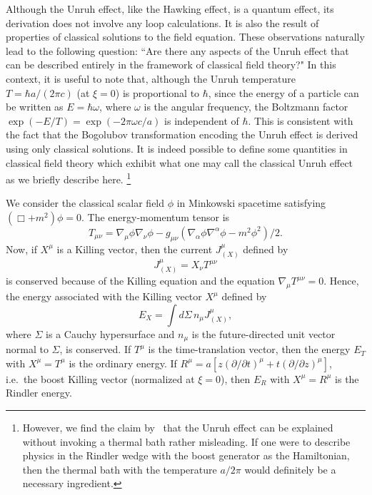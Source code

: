 \documentclass[12pt,nofootinbib,floatfix,aps,prd,showpacs,amsmath,amssymb,eqsecnum]{revtex4-2}
\let\cite\citep
\begin{document}
Although the Unruh effect, like the Hawking effect, is a quantum effect,
its derivation does not involve any loop calculations.  
It is also the result of 
properties of classical solutions to the field equation.  These
observations naturally lead to the following question:
``Are there any aspects of the Unruh effect that can be described
entirely in the framework of classical field theory?" 
In this context, it is useful to note that, although the Unruh 
temperature $T = \hbar a/(2\pi c)$ (at $\xi=0$) is proportional 
to $\hbar$, since the energy of a particle can
be written as $E= \hbar \omega$, where $\omega$ is the angular frequency,
the Boltzmann factor $\exp(-E/ T) = \exp(-2\pi\omega c /a )$ is
independent of
$\hbar$.  This is consistent with the fact that the Bogolubov
transformation encoding the Unruh effect 
is derived using only classical solutions.
It is indeed
possible to define some quantities in classical field theory which 
exhibit what one may call the classical Unruh
effect~\cite{Higuchietal93b} as we briefly describe here.
\footnote{However, we
find the claim by~\textcite{Barutetal90} that the Unruh effect can be
explained without invoking a thermal bath rather misleading.  If one
were to describe physics in the Rindler wedge with the boost generator as the Hamiltonian, then the thermal bath with the temperature $a/2\pi$ 
would definitely be a necessary ingredient.}

We consider the classical scalar field $\phi$ in Minkowski spacetime
satisfying $(\Box +m^2)\phi = 0$.  The energy-momentum tensor is
\begin{equation}
T_{\mu\nu} = \nabla_\mu\phi\nabla_\nu\phi - g_{\mu\nu}
(\nabla_\alpha\phi\nabla^\alpha \phi - m^2\phi^2)/2.
\end{equation}
Now, if 
$X^\mu$ is a Killing vector, then the current $J^\mu_{(X)}$ defined by
\begin{equation}
J^\mu_{(X)} = X_\nu T^{\mu\nu}
\end{equation}
is conserved because of the Killing equation and the equation
$\nabla_\mu T^{\mu\nu} = 0$.  Hence, the energy associated with the
Killing vector $X^\mu$ defined by
\begin{equation}
E_X = \int d\Sigma\, n_\mu J^\mu_{(X)},
\end{equation}
where $\Sigma$ is a Cauchy hypersurface and $n_\mu$ is the future-directed
unit vector normal to
$\Sigma$, is conserved.  
If $T^\mu$ is the time-translation vector, then the energy
$E_T$ with $X^\mu=T^\mu$ is the ordinary energy.  If 
$R^\mu = a [z(\partial/\partial t)^\mu + t(\partial/\partial z)^\mu]$, 
i.e.~the boost Killing vector (normalized at $\xi=0$), 
then $E_R$ with $X^\mu=R^\mu$ is the Rindler energy.
\end{document}
